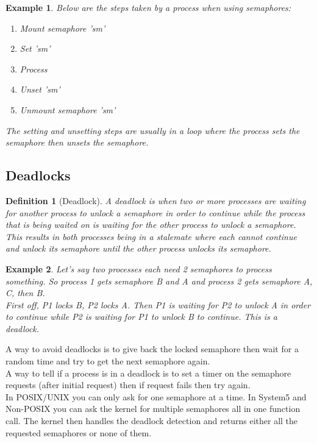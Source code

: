 \documentclass{report}
\newtheorem*{ex}{Example}
\newtheorem*{defn}{Definition}
\begin{document}
\begin{ex}
Below are the steps taken by a process when using semaphores:
\begin{enumerate}
\item Mount semaphore 'sm'
\item Set 'sm'
\item Process
\item Unset 'sm'
\item Unmount semaphore 'sm'
\end{enumerate}
The setting and unsetting steps are usually in a loop where the process sets the semaphore then unsets the semaphore.
\end{ex}

\subsection*{Deadlocks}
\begin{defn}[Deadlock]
A deadlock is when two or more processes are waiting for another process to unlock a semaphore in order to continue while the process that is being waited on is waiting for the other process to unlock a semaphore. This results in both processes being in a stalemate where each cannot continue and unlock its semaphore until the other process unlocks its semaphore.
\end{defn}
\begin{ex}
Let's say two processes each need 2 semaphores to process something. So process 1 gets semaphore B and A and process 2 gets semaphore A, C, then B.\\
First off, P1 locks B, P2 locks A. Then P1 is waiting for P2 to unlock A in order to continue while P2 is waiting for P1 to unlock B to continue. This is a deadlock.
\end{ex}

A way to avoid deadlocks is to give back the locked semaphore then wait for a random time and try to get the next semaphore again.\\

A way to tell if a process is in a deadlock is to set a timer on the semaphore requests (after initial request) then if request fails then try again.\\

In POSIX/UNIX you can only ask for one semaphore at a time. In System5 and Non-POSIX you can ask the kernel for multiple semaphores all in one function call. The kernel then handles the deadlock detection and returns either all the requested semaphores or none of them.
\end{document}
